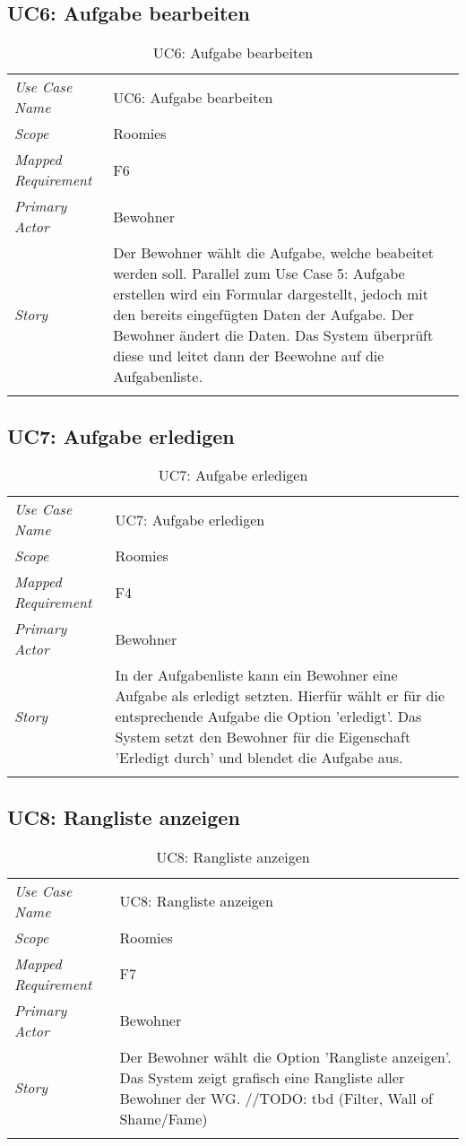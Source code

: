 \subsection{UC6: Aufgabe bearbeiten}
\begin{table}[H]
	\tablestyle
	\tablealtcolored
	\begin{tabularx}{\textwidth}{lX}
		\tablebody
			\textit{Use Case Name} &
			UC6: Aufgabe bearbeiten
			\tabularnewline
			\textit{Scope} &
			Roomies
			\tabularnewline
			\textit{Mapped Requirement} &
			F6
			\tabularnewline
			\textit{Primary Actor} &
			Bewohner
			\tabularnewline
			\textit{Story} &
			Der Bewohner wählt die Aufgabe, welche beabeitet werden soll. Parallel zum Use Case 5: Aufgabe erstellen wird ein Formular dargestellt, jedoch mit den bereits eingefügten Daten der Aufgabe. Der Bewohner ändert die Daten. Das System überprüft diese und leitet dann der Beewohne auf die Aufgabenliste.
			\tabularnewline
		\tableend
	\end{tabularx}
	\caption{UC6: Aufgabe bearbeiten}
\end{table}


\subsection{UC7: Aufgabe erledigen}
\begin{table}[H]
	\tablestyle
	\tablealtcolored
	\begin{tabularx}{\textwidth}{lX}
		\tablebody
			\textit{Use Case Name} &
			UC7: Aufgabe erledigen
			\tabularnewline
			\textit{Scope} &
			Roomies
			\tabularnewline
			\textit{Mapped Requirement} &
			F4
			\tabularnewline
			\textit{Primary Actor} &
			Bewohner
			\tabularnewline
			\textit{Story} &
			In der Aufgabenliste kann ein Bewohner eine Aufgabe als erledigt setzten. Hierfür wählt er für die entsprechende Aufgabe die Option 'erledigt'. Das System setzt den Bewohner für die Eigenschaft 'Erledigt durch' und blendet die Aufgabe aus.
			\tabularnewline
		\tableend
	\end{tabularx}
	\caption{UC7: Aufgabe erledigen}
\end{table}


\subsection{UC8: Rangliste anzeigen}
\begin{table}[H]
	\tablestyle
	\tablealtcolored
	\begin{tabularx}{\textwidth}{lX}
		\tablebody
			\textit{Use Case Name} &
			UC8: Rangliste anzeigen
			\tabularnewline
			\textit{Scope} &
			Roomies
			\tabularnewline
			\textit{Mapped Requirement} &
			F7
			\tabularnewline
			\textit{Primary Actor} &
			Bewohner
			\tabularnewline
			\textit{Story} &
			Der Bewohner wählt die Option 'Rangliste anzeigen'. Das System zeigt grafisch eine Rangliste aller Bewohner der WG. \newline //TODO: tbd (Filter, Wall of Shame/Fame)
			\tabularnewline
		\tableend
	\end{tabularx}
	\caption{UC8: Rangliste anzeigen}
\end{table}


